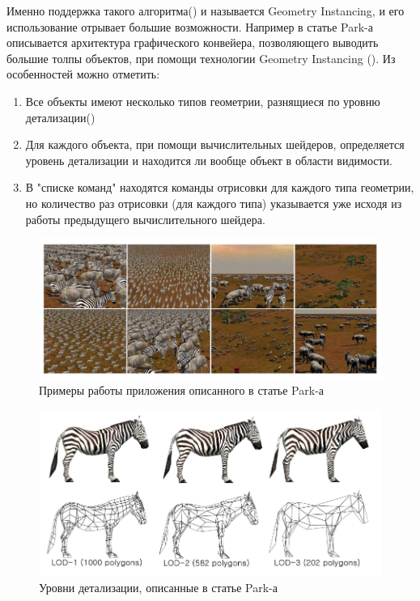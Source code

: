	Именно поддержка такого алгоритма() и называется Geometry Instancing\cite{carucci2005inside}, и его использование отрывает большие возможности. Например в статье Park-а\cite{park2009fast} описывается архитектура графического конвейера, позволяющего выводить большие толпы объектов, при помощи технологии Geometry Instancing (). Из особенностей можно отметить:
	
	\begin{enumerate}[1.]
		\item Все объекты имеют несколько типов геометрии, разнящиеся по уровню детализации()
		\item Для каждого объекта, при помощи вычислительных шейдеров, определяется уровень детализации и находится ли вообще объект в области видимости.
		\item В "списке команд" находятся команды отрисовки для каждого типа геометрии, но количество раз отрисовки (для каждого типа) указывается уже исходя из работы предыдущего вычислительного шейдера.
	\end{enumerate}
	
	\begin{figure}[ht!] 
		\center
		\includegraphics [scale=0.5] {my_folder/images//park_screenshot}
		\caption{Примеры работы приложения описанного в статье Park-а\cite{park2009fast}} 
		\label{fig:park_screenshot}  
	\end{figure}
	
	\begin{figure}[ht!] 
		\center
		\includegraphics [scale=0.5] {my_folder/images//park_lod}
		\caption{Уровни детализации, описанные в статье Park-а\cite{park2009fast}} 
		\label{fig:park_lod}  
	\end{figure}
	\FloatBarrier
	
